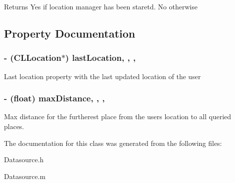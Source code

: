 \begin{DoxyReturn}{Returns}
Yes if location manager has been staretd. No otherwise 
\end{DoxyReturn}


\subsection{Property Documentation}
\subsubsection[{\texorpdfstring{last\+Location}{lastLocation}}]{\setlength{\rightskip}{0pt plus 5cm}-\/ (C\+L\+Location$\ast$) last\+Location\hspace{0.3cm}{\ttfamily [read]}, {\ttfamily [write]}, {\ttfamily [nonatomic]}, {\ttfamily [retain]}}\hypertarget{interface_datasource_ac4e466cbb47cc7ff9529aa074563be46}{}\label{interface_datasource_ac4e466cbb47cc7ff9529aa074563be46}
Last location property with the last updated location of the user 
\subsubsection[{\texorpdfstring{max\+Distance}{maxDistance}}]{\setlength{\rightskip}{0pt plus 5cm}-\/ (float) max\+Distance\hspace{0.3cm}{\ttfamily [read]}, {\ttfamily [write]}, {\ttfamily [nonatomic]}, {\ttfamily [assign]}}\hypertarget{interface_datasource_a7d43597bc00ede549bf34a4969ab8d6e}{}\label{interface_datasource_a7d43597bc00ede549bf34a4969ab8d6e}
Max distance for the furtherest place from the users location to all queried places. 

The documentation for this class was generated from the following files\+:\begin{DoxyCompactItemize}
\item 
Datasource.\+h\item 
Datasource.\+m\end{DoxyCompactItemize}
